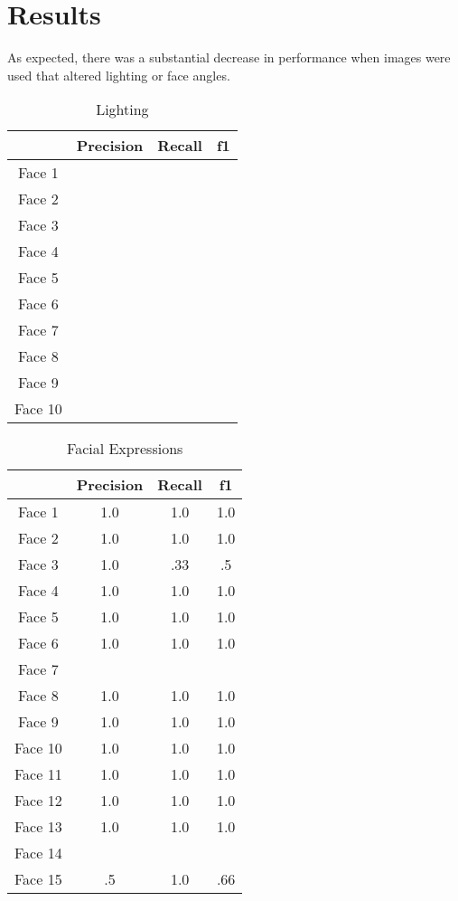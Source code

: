 \documentclass[letterpaper]{article}
\begin{document}
\section{Results}
As expected, there was a substantial decrease in performance when images were used that altered lighting or face angles.
\begin{table}
\caption{Lighting}
\begin{center}
\label{standard}
\begin {tabular} {|c|c|c|c|}
\hline
& \textrm{Precision} & \textrm{Recall} & \textrm{f1}\\
\hline
Face 1 &  &  &  \\
\hline
Face 2 &  &  &  \\
\hline
Face 3 &  &  &  \\
\hline
Face 4 &  &  &  \\
\hline
Face 5 &  &  &  \\
\hline
Face 6 &  &  &  \\
\hline
Face 7 &  &  &  \\
\hline
Face 8 &  &  &  \\
\hline
Face 9 &  &  &  \\
\hline
Face 10 &  &  &  \\
\hline
\end {tabular}
\end{center}
\end{table}
\begin{table}
\caption{Facial Expressions}
\begin{center}
\label{lighting}
\begin {tabular} {|c|c|c|c|}
\hline
& \textrm{Precision} & \textrm{Recall} & \textrm{f1}\\
\hline
Face 1 & 1.0 &1.0  &1.0  \\
\hline
Face 2 & 1.0 &1.0  &1.0  \\
\hline
Face 3 & 1.0 &.33  &.5  \\
\hline
Face 4 & 1.0 &1.0  &1.0  \\
\hline
Face 5 & 1.0 &1.0  &1.0  \\
\hline
Face 6 & 1.0 &1.0  &1.0  \\
\hline
Face 7 &  &  &  \\
\hline
Face 8 & 1.0 &1.0  &1.0  \\
\hline
Face 9 & 1.0 &1.0  &1.0  \\
\hline
Face 10 & 1.0 &1.0  &1.0  \\
\hline
Face 11 & 1.0 &1.0  &1.0  \\
\hline
Face 12 & 1.0 &1.0  &1.0  \\
\hline
Face 13 & 1.0 &1.0  &1.0  \\
\hline
Face 14 &  &  &  \\
\hline
Face 15 & .5 &1.0  &.66  \\
\hline
\end {tabular}
\end{center}
\end{table}
\end{document}
